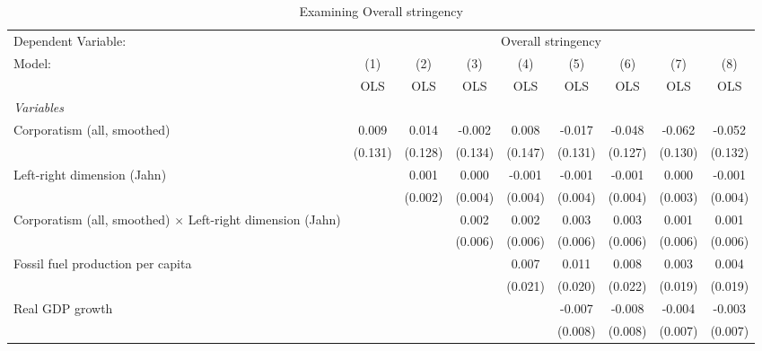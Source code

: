 
\begin{table}[htbp]
   \caption{Examining Overall stringency}
   \centering
   \begin{tabular}{lcccccccc}
      \toprule
      Dependent Variable: & \multicolumn{8}{c}{Overall stringency}\\
      Model:                                                            & (1)     & (2)     & (3)     & (4)     & (5)     & (6)     & (7)     & (8)\\  
                                                                        &  OLS    & OLS     & OLS     & OLS     & OLS     & OLS     & OLS     & OLS\\  
      \midrule
      \emph{Variables}\\
      Corporatism (all, smoothed)                                       & 0.009   & 0.014   & -0.002  & 0.008   & -0.017  & -0.048  & -0.062  & -0.052\\   
                                                                        & (0.131) & (0.128) & (0.134) & (0.147) & (0.131) & (0.127) & (0.130) & (0.132)\\   
      Left-right dimension (Jahn)                                       &         & 0.001   & 0.000   & -0.001  & -0.001  & -0.001  & 0.000   & -0.001\\   
                                                                        &         & (0.002) & (0.004) & (0.004) & (0.004) & (0.004) & (0.003) & (0.004)\\   
      Corporatism (all, smoothed) $\times$ Left-right dimension (Jahn)  &         &         & 0.002   & 0.002   & 0.003   & 0.003   & 0.001   & 0.001\\   
                                                                        &         &         & (0.006) & (0.006) & (0.006) & (0.006) & (0.006) & (0.006)\\   
      Fossil fuel production per capita                                 &         &         &         & 0.007   & 0.011   & 0.008   & 0.003   & 0.004\\   
                                                                        &         &         &         & (0.021) & (0.020) & (0.022) & (0.019) & (0.019)\\   
      Real GDP growth                                                   &         &         &         &         & -0.007  & -0.008  & -0.004  & -0.003\\   
                                                                        &         &         &         &         & (0.008) & (0.008) & (0.007) & (0.007)\\   

\end{tabular}
\end{table}
